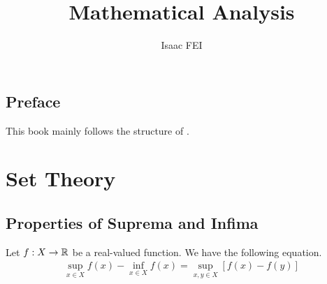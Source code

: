 \documentclass[thmcnt=section, 12pt]{my-elegantbook}
\title{Mathematical Analysis}
\author{Isaac FEI}
\begin{document}
\maketitle


\frontmatter
\section*{Preface}

This book mainly follows the structure of \cite{apostolMathematicalAnalysisModern1974}.


\tableofcontents
\mainmatter



\chapter{Set Theory}


\section{Properties of Suprema and Infima}

\begin{theorem} \label{thm:27}
    Let $f: X \to \mathbb{R}$ be a real-valued function. We have the following equation.
    \begin{align}
        \sup_{x \in X} f(x) - \inf_{x \in X} f(x)
        = \sup_{x,y \in X} [f(x) - f(y)]
        \label{eq:66}
    \end{align}
\end{theorem}
\end{document}

